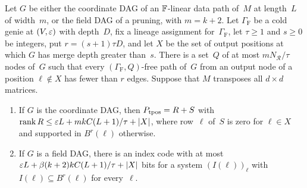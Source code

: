 \begin{theorem}\label{thm:HCprime}
Let $G$ be either the coordinate DAG of an $\mathbb{F}$-linear data path of~$M$ at length~$L$ of width~$m$, or the field DAG of
a pruning, with $m=k+2$. Let $\Gamma_{\mathrm F}$ be a cold genie at $(V,\varepsilon)$ with depth~$D$, fix a lineage
assignment for~$\Gamma_{\mathrm F}$, let $\tau\ge1$ and $s\ge0$ be integers, put $r=(s+1)\tau D$, and let $X$ be
the set of output positions at which $G$ has merge depth greater than~$s$. There is a set~$Q$ of at most
$mN_{\mathcal R}/\tau$ nodes of~$G$ such that every $(\Gamma_{\mathrm F},Q)$-free path of~$G$ from an output node of a
position $\ell\notin X$ has fewer than $r$ edges. Suppose that $M$ transposes all $d\times d$ matrices.
\begin{enumerate}[label=(\alph*)]
\item If $G$ is the coordinate DAG, then $P_{\operatorname{tpos}}=R+S$ with $\operatorname{rank} R\le\varepsilon L+mkC(L+1)/\tau+\lvert X \rvert$, where row~$\ell$
of~$S$ is zero for $\ell\in X$ and supported in $B^r(\ell)$ otherwise.
\item If $G$ is a field DAG, there is an index code with at most $\varepsilon L+\beta(k+2)kC(L+1)/\tau+\lvert X \rvert$ bits for a
system $(I(\ell))_\ell$ with $I(\ell)\subseteq B^r(\ell)$ for every~$\ell$.
\end{enumerate}
\end{theorem}

